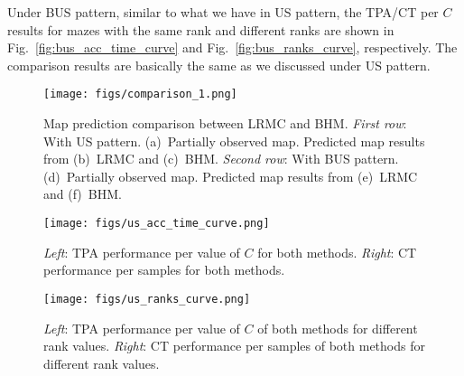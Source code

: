 Under BUS pattern, similar to what we have in US pattern, the TPA/CT per $C$ results for mazes with the same rank and different ranks are shown in Fig.~\ref{fig:bus_acc_time_curve} and Fig.~\ref{fig:bus_ranks_curve}, respectively. The comparison results are basically the same as we discussed under US pattern.




\begin{figure}
  \centering
  	{\label{fig:comparison_1}\texttt{[image: figs/comparison\_1.png]}}
  \caption{\small Map prediction comparison between LRMC and BHM. \textit{First row}: With US pattern. (a)~Partially observed map. Predicted map results from (b)~LRMC and (c)~BHM. \textit{Second row}: With BUS pattern. (d)~Partially observed map. Predicted map results from (e)~LRMC and (f)~BHM.  } \vspace{-10pt}
\label{fig:comparison_1}  
\end{figure}

\begin{figure} 
  \centering
  	{\label{fig:us_acc_time_curve}\texttt{[image: figs/us\_acc\_time\_curve.png]}}
  \caption{\small \textit{Left}: TPA performance per value of $C$ for both methods. \textit{Right}: CT performance per samples for both methods. 
  } \vspace{-10pt}
\label{fig:us_acc_time_curve}  
\end{figure}

\begin{figure}%
  \centering
  	{\label{fig:us_ranks_curve}\texttt{[image: figs/us\_ranks\_curve.png]}}
  \caption{\small \textit{Left}: TPA performance per value of $C$ of both methods for different rank values. \textit{Right}: CT performance per samples of both methods for different rank values.
  } \vspace{-10pt}
\label{fig:us_ranks_curve}  
\end{figure}


